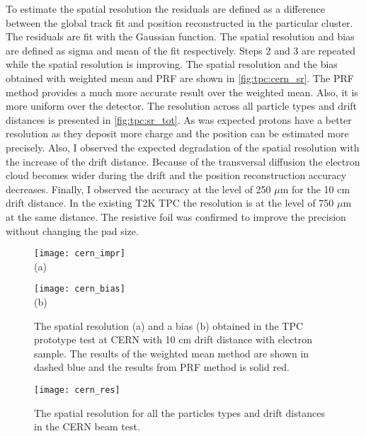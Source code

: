 \documentclass[../main.tex]{subfiles}
\begin{document}
To estimate the spatial resolution the residuals are defined as a difference between the global track fit and position reconstructed in the particular cluster. The residuals are fit with the Gaussian function. The spatial resolution and bias are defined as sigma and mean of the fit respectively. Steps 2 and 3 are repeated while the spatial resolution is improving. The spatial resolution and the bias obtained with weighted mean and PRF are shown in \autoref{fig:tpc:cern_sr}. The PRF method provides a much more accurate result over the weighted mean. Also, it is more uniform over the detector. The resolution across all particle types and drift distances is presented in \autoref{fig:tpc:sr_tot}. As was expected protons have a better resolution as they deposit more charge and the position can be estimated more precisely. Also, I observed the expected degradation of the spatial resolution with the increase of the drift distance. Because of the transversal diffusion the electron cloud becomes wider during the drift and the position reconstruction accuracy decreases. Finally, I observed the accuracy at the level of 250 $\mu\text{m}$ for the 10 cm drift distance. In the existing T2K TPC the resolution is at the level of 750 $\mu\text{m}$ at the same distance. The resistive foil was confirmed to improve the precision without changing the pad size.

\begin{figure}[!ht]
  \centering
  \begin{minipage}{0.49\linewidth}
    \centering
    \texttt{[image: cern\_impr]} \\ (a)
  \end{minipage}
  \begin{minipage}{0.49\linewidth}
    \centering
    \texttt{[image: cern\_bias]} \\ (b)
  \end{minipage}
  \caption{The spatial resolution (a) and a bias (b) obtained in the TPC prototype test at CERN with 10 cm drift distance with electron sample. The results of the weighted mean method are shown in dashed blue and the results from PRF method is solid red.}
  \label{fig:tpc:cern_sr}
\end{figure}

\begin{figure}[!ht]
  \centering
  \texttt{[image: cern\_res]}
  \caption{The spatial resolution for all the particles types and drift distances in the CERN beam test.}
  \label{fig:tpc:sr_tot}
\end{figure}
\end{document}
